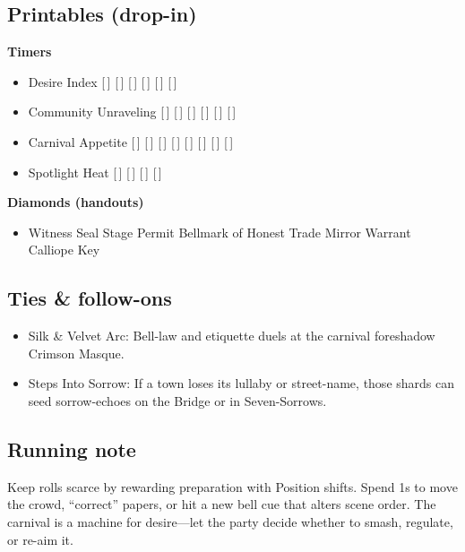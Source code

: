 \documentclass[11pt]{article}
\newcommand{\divider}{\vspace{12pt}\noindent\makebox[\linewidth]{\rule{\textwidth}{0.4pt}}\vspace{12pt}}
\begin{document}
\divider

\subsection*{Printables (drop-in)}

\textbf{Timers}
\begin{itemize}
\item Desire Index [\,] [\,] [\,] [\,] [\,] [\,]
\item Community Unraveling [\,] [\,] [\,] [\,] [\,] [\,]
\item Carnival Appetite [\,] [\,] [\,] [\,] [\,] [\,] [\,] [\,]
\item Spotlight Heat [\,] [\,] [\,] [\,]
\end{itemize}

\textbf{Diamonds (handouts)}
\begin{itemize}
\item Witness Seal \quad Stage Permit \quad Bellmark of Honest Trade \quad Mirror Warrant \quad Calliope Key
\end{itemize}

\divider

\subsection*{Ties \& follow-ons}
\begin{itemize}
\item Silk \& Velvet Arc: Bell-law and etiquette duels at the carnival foreshadow Crimson Masque.
\item Steps Into Sorrow: If a town loses its lullaby or street-name, those shards can seed sorrow-echoes on the Bridge or in Seven-Sorrows.
\end{itemize}

\divider

\subsection*{Running note}

Keep rolls scarce by rewarding preparation with Position shifts. Spend 1s to move the crowd, ``correct'' papers, or hit a new bell cue that alters scene order. The carnival is a machine for desire---let the party decide whether to smash, regulate, or re-aim it.
\end{document}
